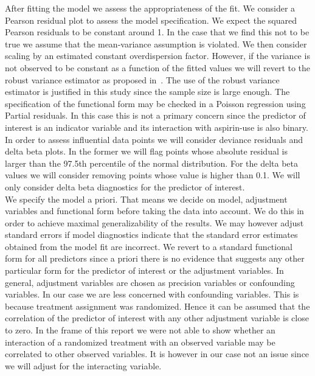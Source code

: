\documentclass[paper=a4, fontsize=11pt]{scrartcl} %
\numberwithin{equation}{section} %
\numberwithin{figure}{section} %
\numberwithin{table}{section} %
\begin{document}
After fitting the model we assess the appropriateness of the fit. We consider a Pearson residual plot to assess the model specification. We expect the squared Pearson residuals to be constant around 1. In the case that we find this not to be true we assume that the mean-variance assumption is violated. We then consider scaling by an estimated constant overdispersion factor. However, if the variance is not observed to be constant as a function of the fitted values we will revert to the robust variance estimator as proposed in~\cite{sandwich}. The use of the robust variance estimator is justified in this study since the sample size is large enough. The specification of the functional form may be checked in a Poisson regression using Partial residuals. In this case this is not a primary concern since the predictor of interest is an indicator variable and its interaction with aspirin-use is also binary. In order to assess influential data points we will consider deviance residuals and delta beta plots. In the former we will flag points whose absolute residual is larger than the 97.5th percentile of the normal distribution. For the delta beta values we will consider removing points whose value is higher than 0.1. We will only consider delta beta diagnostics for the predictor of interest.\\


We specify the model a priori. That means we decide on model, adjustment variables and functional form before taking the data into account. We do this in order to achieve maximal generalizability of the results. We may however adjust standard errors if model diagnostics indicate that the standard error estimates obtained from the model fit are incorrect. We revert to a standard functional form for all predictors since a priori there is no evidence that suggests any other particular form for the predictor of interest or the adjustment variables. In general, adjustment variables are chosen as precision variables or confounding variables. In our case we are less concerned with confounding variables. This is because treatment assignment was randomized. Hence it can be assumed that the correlation of the predictor of interest with any other adjustment variable is close to zero. In the frame of this report we were not able to show whether an interaction of a randomized treatment with an observed variable may be correlated to other observed variables. It is however in our case not an issue since we will adjust for the interacting variable.\\
\end{document}
